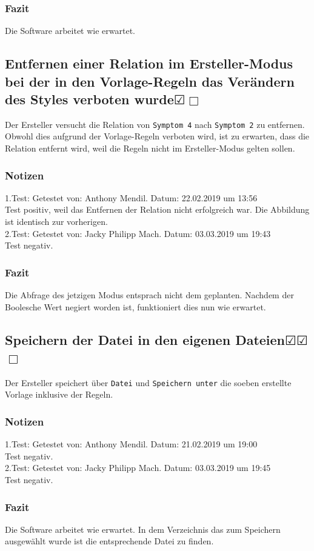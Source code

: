\documentclass[enabledeprecatedfontcommands]{scrartcl}
\newcommand{\subsectiont}[2]{\subsection[#1]{#1{\normalsize\normalfont #2}}}
\newcommand{\leer}{$\Box$}
\newcommand{\ok}{$\CheckedBox$}
\begin{document}
\subsubsection{Fazit}
Die Software arbeitet wie erwartet.

\subsectiont{Entfernen einer Relation im Ersteller-Modus bei der in den Vorlage-Regeln das Verändern des Styles verboten wurde}{\dotfill\XBox\ok\leer}
Der Ersteller versucht die Relation von \texttt{Symptom 4} nach \texttt{Symptom 2} zu entfernen. Obwohl dies aufgrund der Vorlage-Regeln verboten wird, ist zu erwarten, dass die Relation entfernt wird, weil die Regeln nicht im Ersteller-Modus gelten sollen.
\subsubsection{Notizen}
1.Test: Getestet von: Anthony Mendil. Datum: 22.02.2019 um 13:56 \\
Test positiv, weil das Entfernen der Relation nicht erfolgreich war. Die Abbildung ist identisch zur vorherigen. \\ 
2.Test: Getestet von: Jacky Philipp Mach. Datum: 03.03.2019 um 19:43 \\
Test negativ. 

\subsubsection{Fazit} 
Die Abfrage des jetzigen Modus entsprach nicht dem geplanten. Nachdem der Boolesche Wert negiert worden ist, funktioniert dies nun wie erwartet.

\subsectiont{Speichern der Datei in den eigenen Dateien}{\dotfill\ok\ok\leer}
Der Ersteller speichert über \texttt{Datei} und \texttt{Speichern unter} die soeben erstellte Vorlage inklusive der Regeln. 
\subsubsection{Notizen}
1.Test: Getestet von: Anthony Mendil. Datum: 21.02.2019 um 19:00 \\
Test negativ.\\
2.Test: Getestet von: Jacky Philipp Mach. Datum: 03.03.2019 um 19:45 \\
Test negativ.
\subsubsection{Fazit}
Die Software arbeitet wie erwartet. In dem Verzeichnis das zum Speichern ausgewählt wurde ist die entsprechende Datei zu finden. 
\end{document}
